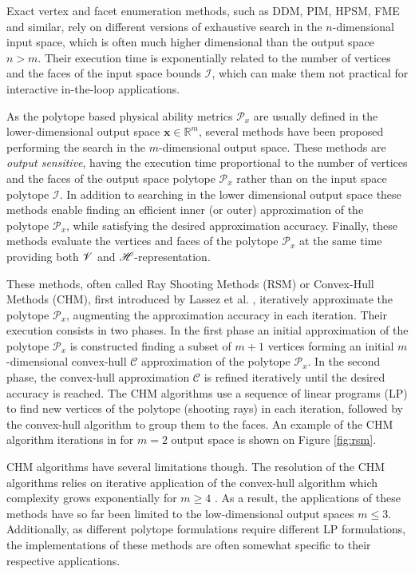 Exact vertex and facet enumeration methods, such as DDM\cite{fukuda_dd}, PIM\cite{avis_pivoting_nodate}, HPSM\cite{hyper_psm}, FME\cite{dantzig1973fourier} and similar, rely on different versions of exhaustive search in the $n$-dimensional input space, which is often much higher dimensional than the output space $n>m$. Their execution time is exponentially related to the number of vertices and the faces of the input space bounds $\mathcal{I}$\cite{avis_comparative_2015}, which can make them not practical for interactive in-the-loop applications. 

As the polytope based physical ability metrics $\mathcal{P}_x$ are usually defined in the lower-dimensional output space $\bm{x}\in \mathbb{R}^m$, several methods have been proposed performing the search in the $m$-dimensional output space. These methods are \textit{output sensitive}, having the execution time proportional to the number of vertices and the faces of the output space polytope $\mathcal{P}_x$ rather than on the input space polytope $\mathcal{I}$. 
In addition to searching in the lower dimensional output space these methods enable finding an efficient inner (or outer) approximation of the polytope $\mathcal{P}_x$, while satisfying the desired approximation accuracy. Finally, these methods evaluate the vertices and faces of the polytope $\mathcal{P}_x$ at the same time providing both $\mathscr{V}$ and $\mathscr{H}$-representation.

These methods, often called Ray Shooting Methods (RSM) or Convex-Hull Methods (CHM), first introduced by Lassez et al. \cite{lassez1992quantifier, Huynh2005PracticalIO}, iteratively approximate the polytope $\mathcal{P}_x$,  augmenting the approximation accuracy in each iteration. Their execution consists in two phases. In the first phase an initial approximation of the polytope $\mathcal{P}_x$ is constructed finding a subset of $m+1$ vertices forming an initial $m$-dimensional convex-hull $\mathcal{C}$ approximation of the polytope $\mathcal{P}_x$. In the second phase, the convex-hull approximation $\mathcal{C}$ is refined iteratively until the desired accuracy is reached. The CHM algorithms use a sequence of linear programs (LP) to find new vertices of the polytope (shooting rays) in each iteration, followed by the convex-hull algorithm to group them to the faces. An example of the CHM algorithm iterations in for $m=2$ output space is shown on Figure \ref{fig:rsm}.   

CHM algorithms have several limitations though. The resolution of the CHM algorithms relies on iterative application of the convex-hull algorithm which complexity grows exponentially for $m \geq 4$ \cite{Barber1996}. As a result, the applications of these methods have so far been limited to the low-dimensional output spaces $m\leq3$. Additionally, as different polytope formulations require different LP formulations, the implementations of these methods are often somewhat specific to their respective applications. 

